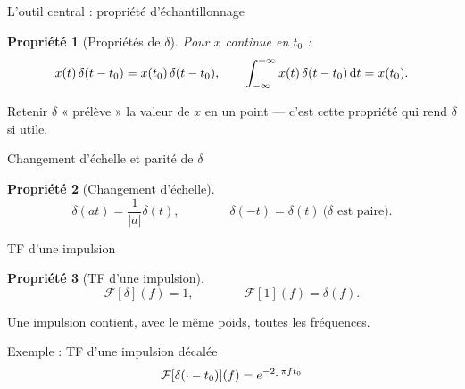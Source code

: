 \documentclass[aspectratio=43,10pt]{beamer}
\newtheorem{proposition}{Propriété}
\newcommand{\highlight}[1]{{\color{niceblue}\emph{#1}}}
\newcommand{\slidefig}[2]{%
\begin{center}
\resizebox{#1}{!}{}
\end{center}
}
\begin{document}
\begin{frame}{L'outil central : propriété d'échantillonnage}
    \begin{proposition}[Propriétés de $\delta$]
        Pour $x$ continue en $t_0$ :
        $$
            x(t)\,\delta(t-t_0) = x(t_0)\,\delta(t-t_0), \qquad
            \int_{-\infty}^{+\infty} x(t)\,\delta(t-t_0)\,{\rm d} t = x(t_0).
        $$
    \end{proposition}
    \slidefig{0.4\textwidth}{dirac-sampling.tex}
    \begin{alertblock}{Retenir}
        $\delta$ « prélève » la valeur de $x$ en un point --- c'est
        cette propriété qui rend $\delta$ si utile.
    \end{alertblock}
\end{frame}

\begin{frame}{Changement d'échelle et parité de $\delta$}
    \begin{proposition}[Changement d'échelle]
        $$
            \delta(at) = \frac{1}{|a|}\delta(t), \qquad\qquad \delta(-t)=\delta(t) \ \text{($\delta$ est paire)}.
        $$
    \end{proposition}
\end{frame}

\begin{frame}{TF d'une impulsion}
    \begin{proposition}[TF d'une impulsion]
        $$
            \mathcal F[\delta](f) = 1, \qquad\qquad \mathcal F[1](f) = \delta(f).
        $$
    \end{proposition}
    \begin{overprint}
    \slidefig{\textwidth}{dirac-tf-limit.tex}
    \slidefig{\textwidth}{dirac-tf-constant.tex}
    \begin{center}\small Une impulsion contient, avec le même poids,
    toutes les fréquences.\end{center}
    \end{overprint}
\end{frame}

\begin{frame}{Exemple : TF d'une impulsion décalée}
    \[
        \mathcal F[\delta(\cdot-t_0)](f) = e^{-2\operatorname{\mathsf{j}}\pi ft_0}
    \]
    \slidefig{\textwidth}{dirac-tf-decale.tex}

\end{frame}
\end{document}
